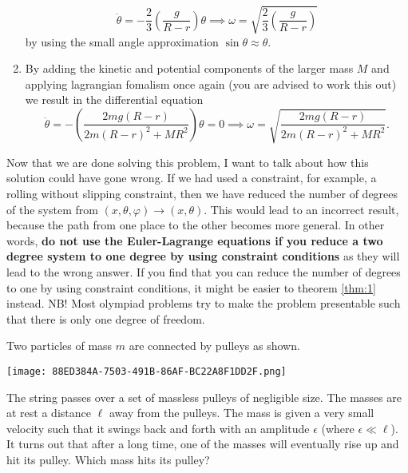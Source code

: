 \documentclass[11pt]{scrartcl}
\begin{document}
\begin{soln}
\begin{enumerate}
    \[\ddot\theta = -\frac{2}{3}\left(\frac{g}{R - r}\right)\theta \implies \omega = \sqrt{\frac{2}{3}\left(\frac{g}{R - r}\right)}\]
    by using the small angle approximation $\sin\theta \approx \theta$.
    \item By adding the kinetic and potential components of the larger mass $M$ and applying lagrangian fomalism once again (you are advised to work this out) we result in the differential equation 
    \[\ddot\theta = -\left(\frac{2mg (R - r)}{2m (R - r)^2 + MR^2}\right)\theta = 0\implies \omega = \sqrt{\frac{2mg (R - r)}{2m (R - r)^2 + MR^2}}.\]
\end{enumerate}
Now that we are done solving this problem, I want to talk about how this solution could have gone wrong. If we had used a constraint, for example, a rolling without slipping constraint, then we have reduced the number of degrees of the system from $(x, \theta, \varphi)\to (x, \theta)$. This would lead to an incorrect result, because the path from one place to the other becomes more general. In other words, \textbf{do not use the Euler-Lagrange equations if you reduce a two degree system to one degree by using constraint conditions} as they will lead to the wrong answer. If you find that you can reduce the number of degrees to one by using constraint conditions, it might be easier to theorem \ref{thm:1} instead. NB! Most olympiad problems try to make the problem presentable such that there is only one degree of freedom. 
\end{soln}
\begin{example}[2018 $F=ma$ B, 1998 BAUPC]
Two particles of mass $m$ are connected by pulleys as shown.
\begin{center}
    \texttt{[image: 88ED384A-7503-491B-86AF-BC22A8F1DD2F.png]}
\end{center}
The string passes over a set of massless pulleys of negligible size. The masses are at rest a distance $\ell$ away from the pulleys. The mass is given a very small velocity such that it swings back and forth with an amplitude $\epsilon$ (where $\epsilon \ll \ell$). It turns out that after a long time, one of the masses will eventually rise up and hit its pulley. Which mass hits its pulley?
\end{example}
\end{document}
